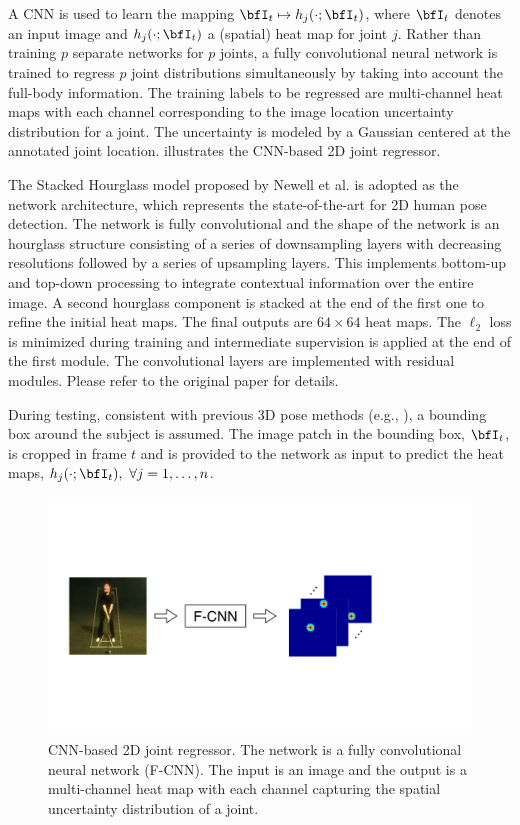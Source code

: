 
A CNN is used to learn the mapping $\bfI_t \mapsto h_j(\cdot;\bfI_t)$, where $\bfI_t$ denotes an input image and $h_j(\cdot;\bfI_t)$ a (spatial) heat map for joint $j$. Rather than training $p$ separate networks for $p$ joints, a fully convolutional neural network \cite{long2015fully} is trained to regress $p$ joint distributions simultaneously by taking into account the full-body information. 
The training labels to be regressed are multi-channel heat maps with each channel corresponding to the image location uncertainty distribution for a joint. The uncertainty is modeled by a Gaussian centered at the annotated joint location.  illustrates the CNN-based 2D joint regressor.


The Stacked Hourglass model proposed by Newell et al. \cite{newell2016stacked} is adopted as the network architecture, which represents the
state-of-the-art for 2D human pose detection. The network is fully convolutional and the shape of the network is an hourglass structure consisting of a series of downsampling layers with decreasing resolutions followed by a series of upsampling layers.  This implements bottom-up and top-down processing to integrate contextual information over the entire image. A second hourglass component is stacked at the end of the first one to refine the initial heat maps. 
The final outputs are $64 \times 64$ heat maps. The $\ell_2$ loss is minimized during training and intermediate supervision is applied at the end of the first module. The convolutional layers are implemented with residual modules. Please refer to the original paper \cite{newell2016stacked} for details. 

During testing, consistent with previous 3D pose methods (e.g., \cite{li2015,tekin2015}), a bounding box around the subject is assumed.
The image patch in the bounding box, $\bfI_t$, is cropped in frame $t$ and is provided to the network as input to predict the heat maps, $h_j(\cdot;\bfI_t),~\forall j=1,\dotsc,n$.

\begin{figure}
  \centering
  \includegraphics[width=\linewidth]{figures/cnn1.pdf}
  \caption{CNN-based 2D joint regressor. The network is a fully convolutional neural network (F-CNN). The input is an image and the output is a multi-channel heat map with each channel capturing the spatial uncertainty distribution of a joint. }\label{fig:cnn}
\end{figure}

